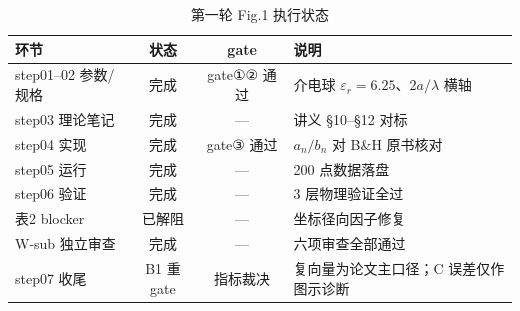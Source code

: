 \begin{table}[H]
\centering
\caption{第一轮 Fig.1 执行状态}
\begin{tabular}{lccl}
\toprule
\textbf{环节} & \textbf{状态} & \textbf{gate} & \textbf{说明} \\
\midrule
step01--02 参数/规格 & 完成 & gate①② 通过 & 介电球 $\varepsilon_r=6.25$、$2a/\lambda$ 横轴 \\
step03 理论笔记 & 完成 & --- & 讲义 §10--§12 对标 \\
step04 实现 & 完成 & gate③ 通过 & $a_n/b_n$ 对 B\&H 原书核对 \\
step05 运行 & 完成 & --- & 200 点数据落盘 \\
step06 验证 & 完成 & --- & 3 层物理验证全过 \\
表2 blocker & 已解阻 & --- & 坐标径向因子修复 \\
W-sub 独立审查 & 完成 & --- & 六项审查全部通过 \\
step07 收尾 & B1 重 gate & 指标裁决 & 复向量为论文主口径；C 误差仅作图示诊断 \\
\bottomrule
\end{tabular}
\end{table}
